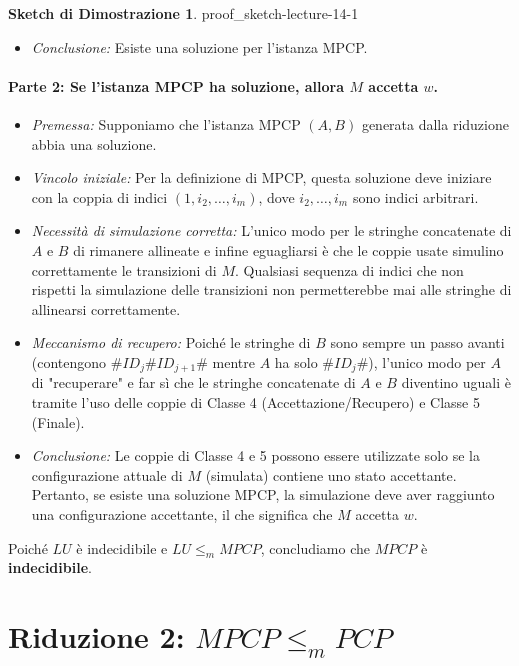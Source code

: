 \documentclass[a4paper]{article}
\theoremstyle{definition} %
\newtheorem{proof_sketch}{Sketch di Dimostrazione} %
\theoremstyle{remark} %
\begin{document}
\begin{proof_sketch}{}{{ proof_sketch-lecture-14-1 }}
\begin{itemize}
    \item \emph{Conclusione:} Esiste una soluzione per l'istanza MPCP.
\end{itemize}

\paragraph{Parte 2: Se l'istanza MPCP ha soluzione, allora $M$ accetta $w$.}

\begin{itemize}
    \item \emph{Premessa:} Supponiamo che l'istanza MPCP $(A, B)$ generata dalla riduzione abbia una soluzione.
    
    \item \emph{Vincolo iniziale:} Per la definizione di MPCP, questa soluzione deve iniziare con la coppia di indici $(1, i_2, \dots, i_m)$, dove $i_2, \dots, i_m$ sono indici arbitrari.
    
    \item \emph{Necessità di simulazione corretta:} L'unico modo per le stringhe concatenate di $A$ e $B$ di rimanere allineate e infine eguagliarsi è che le coppie usate simulino correttamente le transizioni di $M$. Qualsiasi sequenza di indici che non rispetti la simulazione delle transizioni non permetterebbe mai alle stringhe di allinearsi correttamente.
    
    \item \emph{Meccanismo di recupero:} Poiché le stringhe di $B$ sono sempre un passo avanti (contengono $\#ID_j\#ID_{j+1}\#$ mentre $A$ ha solo $\#ID_j\#$), l'unico modo per $A$ di "recuperare" e far sì che le stringhe concatenate di $A$ e $B$ diventino uguali è tramite l'uso delle coppie di Classe 4 (Accettazione/Recupero) e Classe 5 (Finale).
    
    \item \emph{Conclusione:} Le coppie di Classe 4 e 5 possono essere utilizzate solo se la configurazione attuale di $M$ (simulata) contiene uno stato accettante. Pertanto, se esiste una soluzione MPCP, la simulazione deve aver raggiunto una configurazione accettante, il che significa che $M$ accetta $w$.
\end{itemize}
\end{proof_sketch}

Poiché $LU$ è indecidibile e $LU \le_m MPCP$, concludiamo che $MPCP$ è \textbf{indecidibile}.

\section{Riduzione 2: $MPCP \le_m PCP$}
\end{document}
